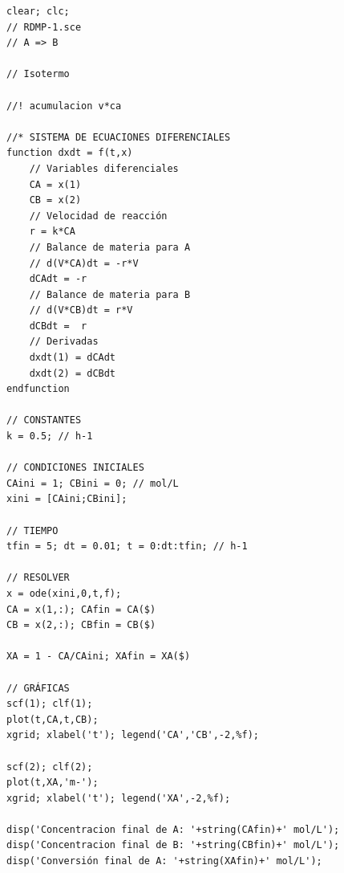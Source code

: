 \newpage %
\solve{}
\begin{verbatim}
clear; clc; 
// RDMP-1.sce
// A => B

// Isotermo     

//! acumulacion v*ca 

//* SISTEMA DE ECUACIONES DIFERENCIALES
function dxdt = f(t,x)
    // Variables diferenciales
    CA = x(1)
    CB = x(2)
    // Velocidad de reacción
    r = k*CA
    // Balance de materia para A
    // d(V*CA)dt = -r*V
    dCAdt = -r
    // Balance de materia para B
    // d(V*CB)dt = r*V
    dCBdt =  r
    // Derivadas
    dxdt(1) = dCAdt
    dxdt(2) = dCBdt
endfunction

// CONSTANTES
k = 0.5; // h-1

// CONDICIONES INICIALES
CAini = 1; CBini = 0; // mol/L
xini = [CAini;CBini];

// TIEMPO
tfin = 5; dt = 0.01; t = 0:dt:tfin; // h-1

// RESOLVER
x = ode(xini,0,t,f);
CA = x(1,:); CAfin = CA($)
CB = x(2,:); CBfin = CB($)

XA = 1 - CA/CAini; XAfin = XA($)

// GRÁFICAS
scf(1); clf(1);
plot(t,CA,t,CB);
xgrid; xlabel('t'); legend('CA','CB',-2,%f);

scf(2); clf(2); 
plot(t,XA,'m-');
xgrid; xlabel('t'); legend('XA',-2,%f);

disp('Concentracion final de A: '+string(CAfin)+' mol/L');
disp('Concentracion final de B: '+string(CBfin)+' mol/L');
disp('Conversión final de A: '+string(XAfin)+' mol/L');
\end{verbatim}
